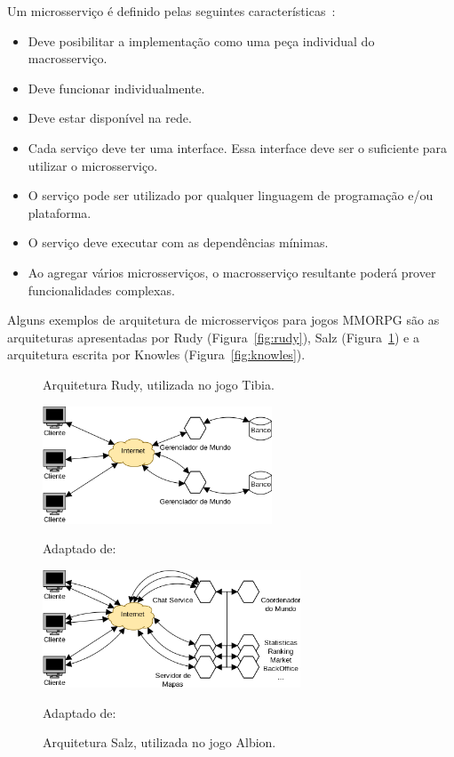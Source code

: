 Um microsserviço é definido pelas seguintes características~\cite{8169955}:

\begin{itemize}
  \item Deve posibilitar a implementação como uma peça individual do macrosserviço.
  \item Deve funcionar individualmente.
  \item Deve estar disponível na rede.
  \item Cada serviço deve ter uma interface. Essa interface deve ser o suficiente para utilizar o microsserviço.
  \item O serviço pode ser utilizado por qualquer linguagem de programação e/ou plataforma.
  \item O serviço deve executar com as dependências mínimas.
  \item Ao agregar vários microsserviços, o macrosserviço resultante poderá prover funcionalidades complexas.
\end{itemize}

Alguns exemplos de arquitetura de microsserviços para jogos \ac{MMORPG} são as arquiteturas apresentadas por Rudy (Figura~\ref{fig:rudy}), Salz (Figura~\ref{fig:salz}) e a arquitetura escrita por Knowles (Figura~\ref{fig:knowles}).

\begin{figure}[htb!]
  \begin{minipage}{.5\textwidth}
    \caption{Arquitetura Rudy, utilizada no jogo Tibia.}
    \label{fig:rudy}
    \includegraphics[height=3.5cm]{arquiteturas/rudy.png}
    \centering

    Adaptado de:~\cite{matthiasrudy2011}
  \end{minipage}
  \begin{minipage}{.5\textwidth}
    \caption{Arquitetura Salz, utilizada no jogo Albion.}
    \label{fig:salz}
    \includegraphics[height=3.5cm]{arquiteturas/salz.png}
    \centering

    Adaptado de:~\cite{albion_online_unite}
  \end{minipage}%
\end{figure}

